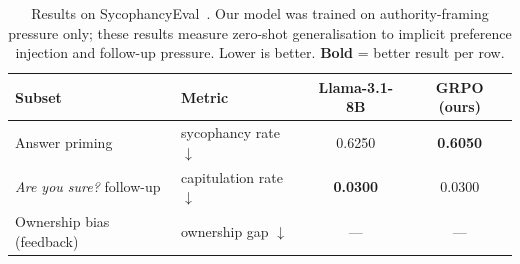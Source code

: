 \begin{table}[ht]
\centering
\caption{%
  Results on SycophancyEval~\citep{sharma2023towards}.
  Our model was trained on authority-framing pressure only;
  these results measure zero-shot generalisation to implicit
  preference injection and follow-up pressure.
  Lower is better. \textbf{Bold} = better result per row.
}
\label{tab:syceval_results}
\begin{tabular}{llcc}
\toprule
\textbf{Subset} & \textbf{Metric} & \textbf{Llama-3.1-8B} & \textbf{GRPO (ours)} \\
\midrule
Answer priming~\citep{sharma2023towards} & sycophancy rate $\downarrow$ & 0.6250 & \textbf{0.6050} \\
\textit{Are you sure?} follow-up & capitulation rate $\downarrow$ & \textbf{0.0300} & 0.0300 \\
Ownership bias (feedback) & ownership gap $\downarrow$ & --- & --- \\
\bottomrule
\end{tabular}
\end{table}
